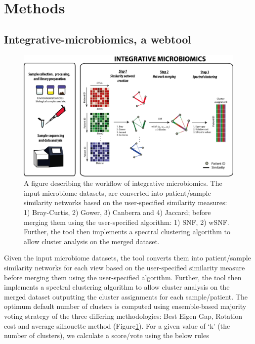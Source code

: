 \section{Methods}

\subsection{Integrative-microbiomics, a webtool}
\begin{figure}[h]
	\centering
	\includegraphics[width=\textwidth]{image/webtool_intro.png}
	\caption{A figure describing the workflow of integrative microbiomics. The input microbiome datasets, are converted into patient/sample similarity networks based on the user-specified similarity measures: 1) Bray-Curtis, 2) Gower, 3) Canberra and 4) Jaccard; before merging them using the user-specified algorithm: 1) SNF, 2) wSNF. Further, the tool then implements a spectral clustering algorithm to allow cluster analysis on the merged dataset.}
	\label{fig3}
\end{figure}

Given the input microbiome datasets, the tool converts them into patient/sample similarity networks for each view based on the user-specified similarity measure before merging them using the user-specified algorithm. Further, the tool then implements a spectral clustering algorithm to allow cluster analysis on the merged dataset outputting the cluster assignments for each sample/patient. The optimum default number of clusters is computed using ensemble-based majority voting strategy of the three differing methodologies: Best Eigen Gap, Rotation cost and average silhouette method (Figure\ref{fig3}). For a given value of `k' (the number of clusters), we calculate a score/vote using the below rules

